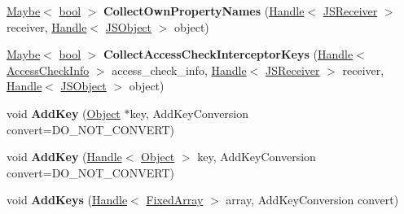 \begin{DoxyCompactItemize}
\item 
\mbox{\label{classv8_1_1internal_1_1KeyAccumulator_aac0264f947ed1d3858e13a7ae73c5aa2}} 
\mbox{\hyperlink{classv8_1_1Maybe}{Maybe}}$<$ \mbox{\hyperlink{classbool}{bool}} $>$ {\bfseries Collect\+Own\+Property\+Names} (\mbox{\hyperlink{classv8_1_1internal_1_1Handle}{Handle}}$<$ \mbox{\hyperlink{classv8_1_1internal_1_1JSReceiver}{J\+S\+Receiver}} $>$ receiver, \mbox{\hyperlink{classv8_1_1internal_1_1Handle}{Handle}}$<$ \mbox{\hyperlink{classv8_1_1internal_1_1JSObject}{J\+S\+Object}} $>$ object)
\item 
\mbox{\label{classv8_1_1internal_1_1KeyAccumulator_ad1ab7683e80e615eefb7c904143a0a77}} 
\mbox{\hyperlink{classv8_1_1Maybe}{Maybe}}$<$ \mbox{\hyperlink{classbool}{bool}} $>$ {\bfseries Collect\+Access\+Check\+Interceptor\+Keys} (\mbox{\hyperlink{classv8_1_1internal_1_1Handle}{Handle}}$<$ \mbox{\hyperlink{classv8_1_1internal_1_1AccessCheckInfo}{Access\+Check\+Info}} $>$ access\+\_\+check\+\_\+info, \mbox{\hyperlink{classv8_1_1internal_1_1Handle}{Handle}}$<$ \mbox{\hyperlink{classv8_1_1internal_1_1JSReceiver}{J\+S\+Receiver}} $>$ receiver, \mbox{\hyperlink{classv8_1_1internal_1_1Handle}{Handle}}$<$ \mbox{\hyperlink{classv8_1_1internal_1_1JSObject}{J\+S\+Object}} $>$ object)
\item 
\mbox{\label{classv8_1_1internal_1_1KeyAccumulator_a3dedef29f4df4bbd9f241c753eb5ccc5}} 
void {\bfseries Add\+Key} (\mbox{\hyperlink{classv8_1_1internal_1_1Object}{Object}} $\ast$key, Add\+Key\+Conversion convert=D\+O\+\_\+\+N\+O\+T\+\_\+\+C\+O\+N\+V\+E\+RT)
\item 
\mbox{\label{classv8_1_1internal_1_1KeyAccumulator_affd8ce083cbd0c6f65984c9ec05b3fd7}} 
void {\bfseries Add\+Key} (\mbox{\hyperlink{classv8_1_1internal_1_1Handle}{Handle}}$<$ \mbox{\hyperlink{classv8_1_1internal_1_1Object}{Object}} $>$ key, Add\+Key\+Conversion convert=D\+O\+\_\+\+N\+O\+T\+\_\+\+C\+O\+N\+V\+E\+RT)
\item 
\mbox{\label{classv8_1_1internal_1_1KeyAccumulator_a179a9dcc82bff5b81a1dabdb3ac42d9f}} 
void {\bfseries Add\+Keys} (\mbox{\hyperlink{classv8_1_1internal_1_1Handle}{Handle}}$<$ \mbox{\hyperlink{classv8_1_1internal_1_1FixedArray}{Fixed\+Array}} $>$ array, Add\+Key\+Conversion convert)

\end{DoxyCompactItemize}

